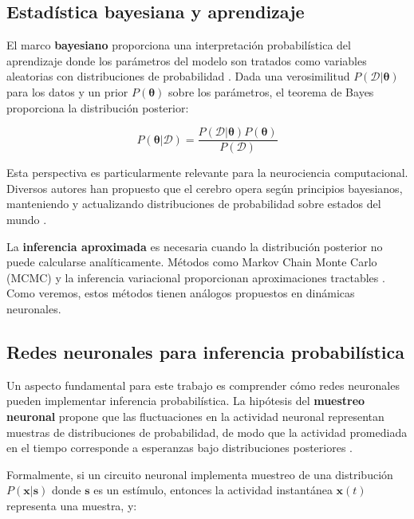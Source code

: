 \subsection{Estadística bayesiana y aprendizaje}
\label{subsec:bayesiana_aprendizaje}

El marco \textbf{bayesiano} proporciona una interpretación probabilística del aprendizaje donde los parámetros del modelo son tratados como variables aleatorias con distribuciones de probabilidad \citep{bishop2006pattern}. Dada una verosimilitud $P(\mathcal{D}|\boldsymbol{\theta})$ para los datos y un prior $P(\boldsymbol{\theta})$ sobre los parámetros, el teorema de Bayes proporciona la distribución posterior:

\begin{equation}
P(\boldsymbol{\theta}|\mathcal{D}) = \frac{P(\mathcal{D}|\boldsymbol{\theta})P(\boldsymbol{\theta})}{P(\mathcal{D})}
\label{eq:bayes_learning}
\end{equation}

Esta perspectiva es particularmente relevante para la neurociencia computacional. 
Diversos autores han propuesto que el cerebro opera según principios bayesianos, 
manteniendo y actualizando distribuciones de probabilidad sobre estados del mundo 
\citep{dayan2005theoretical, eliasmith2003neural}.

La \textbf{inferencia aproximada} es necesaria cuando la distribución posterior 
no puede calcularse analíticamente. Métodos como Markov Chain Monte Carlo (MCMC) 
y la inferencia variacional proporcionan aproximaciones tractables 
\citep{heaton2018ian}. Como veremos, estos métodos tienen análogos propuestos 
en dinámicas neuronales.

\subsection{Redes neuronales para inferencia probabilística}
\label{subsec:redes_inferencia}

Un aspecto fundamental para este trabajo es comprender cómo redes neuronales pueden implementar inferencia probabilística. La hipótesis del \textbf{muestreo neuronal} propone que las fluctuaciones en la actividad neuronal representan muestras de 
distribuciones de probabilidad, de modo que la actividad promediada en el tiempo corresponde a esperanzas bajo distribuciones posteriores \citep{echeveste2020cortical}.

Formalmente, si un circuito neuronal implementa muestreo de una distribución $P(\mathbf{x}|\mathbf{s})$ donde $\mathbf{s}$ es un estímulo, entonces la actividad instantánea $\mathbf{x}(t)$ representa una muestra, y:

